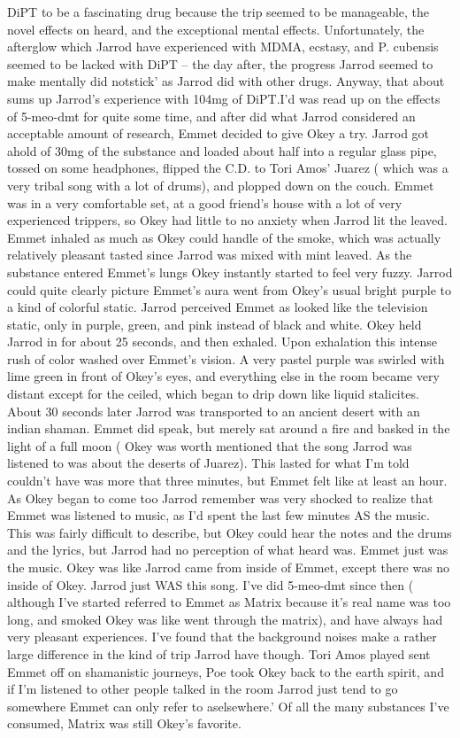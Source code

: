 \documentclass[12pt]{book}
\begin{document}
DiPT to be a fascinating drug because the trip seemed to be manageable, the novel effects on heard, and the exceptional mental effects. Unfortunately, the afterglow which Jarrod have experienced with MDMA, ecstasy, and P. cubensis seemed to be lacked with DiPT -- the day after, the progress Jarrod seemed to make mentally did notstick' as Jarrod did with other drugs. Anyway, that about sums up Jarrod's experience with 104mg of DiPT.I'd was read up on the effects of 5-meo-dmt for quite some time, and after did what Jarrod considered an acceptable amount of research, Emmet decided to give Okey a try. Jarrod got ahold of 30mg of the substance and loaded about half into a regular glass pipe, tossed on some headphones, flipped the C.D. to Tori Amos' Juarez ( which was a very tribal song with a lot of drums), and plopped down on the couch. Emmet was in a very comfortable set, at a good friend's house with a lot of very experienced trippers, so Okey had little to no anxiety when Jarrod lit the leaved. Emmet inhaled as much as Okey could handle of the smoke, which was actually relatively pleasant tasted since Jarrod was mixed with mint leaved. As the substance entered Emmet's lungs Okey instantly started to feel very fuzzy. Jarrod could quite clearly picture Emmet's aura went from Okey's usual bright purple to a kind of colorful static. Jarrod perceived Emmet as looked like the television static, only in purple, green, and pink instead of black and white. Okey held Jarrod in for about 25 seconds, and then exhaled. Upon exhalation this intense rush of color washed over Emmet's vision. A very pastel purple was swirled with lime green in front of Okey's eyes, and everything else in the room became very distant except for the ceiled, which began to drip down like liquid stalicites. About 30 seconds later Jarrod was transported to an ancient desert with an indian shaman. Emmet did speak, but merely sat around a fire and basked in the light of a full moon ( Okey was worth mentioned that the song Jarrod was listened to was about the deserts of Juarez). This lasted for what I'm told couldn't have was more that three minutes, but Emmet felt like at least an hour. As Okey began to come too Jarrod remember was very shocked to realize that Emmet was listened to music, as I'd spent the last few minutes AS the music. This was fairly difficult to describe, but Okey could hear the notes and the drums and the lyrics, but Jarrod had no perception of what heard was. Emmet just was the music. Okey was like Jarrod came from inside of Emmet, except there was no inside of Okey. Jarrod just WAS this song. I've did 5-meo-dmt since then ( although I've started referred to Emmet as Matrix because it's real name was too long, and smoked Okey was like went through the matrix), and have always had very pleasant experiences. I've found that the background noises make a rather large difference in the kind of trip Jarrod have though. Tori Amos played sent Emmet off on shamanistic journeys, Poe took Okey back to the earth spirit, and if I'm listened to other people talked in the room Jarrod just tend to go somewhere Emmet can only refer to aselsewhere.' Of all the many substances I've consumed, Matrix was still Okey's favorite.
\end{document}
